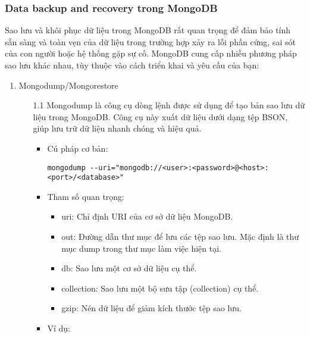 \subsubsection{Data backup and recovery trong MongoDB}
\indent Sao lưu và khôi phục dữ liệu trong MongoDB rất quan trọng để đảm bảo tính sẵn sàng và toàn vẹn của dữ liệu trong trường hợp xảy ra lỗi phần cứng, sai sót của con người hoặc hệ thống gặp sự cố. MongoDB cung cấp nhiều phương pháp sao lưu khác nhau, tùy thuộc vào cách triển khai và yêu cầu của bạn:
\begin{enumerate}
    \item Mongodump/Mongorestore
    \begin{enumerate}
        \item[1.1] Mongodump là công cụ dòng lệnh được sử dụng để tạo bản sao lưu dữ liệu trong MongoDB. Công cụ này xuất dữ liệu dưới dạng tệp BSON, giúp lưu trữ dữ liệu nhanh chóng và hiệu quả.
        \begin{itemize}
            \item Cú pháp cơ bản:
            \begin{lstlisting}
mongodump --uri="mongodb://<user>:<password>@<host>:<port>/<database>"
            \end{lstlisting}
            \item Tham số quan trọng:
            \begin{itemize}
                \item uri: Chỉ định URI của cơ sở dữ liệu MongoDB.
                \item out: Đường dẫn thư mục để lưu các tệp sao lưu. Mặc định là thư mục dump trong thư mục làm việc hiện tại.
                \item db: Sao lưu một cơ sở dữ liệu cụ thể.
                \item collection: Sao lưu một bộ sưu tập (collection) cụ thể.
                \item gzip: Nén dữ liệu để giảm kích thước tệp sao lưu.
            \end{itemize}
            \item Ví dụ:
            

\end{itemize}
\end{enumerate}
\end{enumerate}

